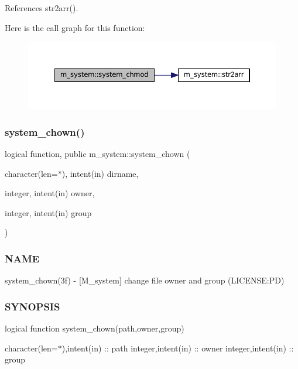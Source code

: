 References str2arr().

Here is the call graph for this function\+:
\nopagebreak
\begin{figure}[H]
\begin{center}
\leavevmode
\includegraphics[width=350pt]{namespacem__system_ace9ce0c8a9c8341a76b8903cd2390ce3_cgraph}
\end{center}
\end{figure}
\mbox{\label{namespacem__system_a3353c1cff032fcfe2985a69f10038ddd}} 
\subsubsection{\texorpdfstring{system\+\_\+chown()}{system\_chown()}}
{\footnotesize\ttfamily logical function, public m\+\_\+system\+::system\+\_\+chown (\begin{DoxyParamCaption}\item[{character(len=$\ast$), intent(in)}]{dirname,  }\item[{integer, intent(in)}]{owner,  }\item[{integer, intent(in)}]{group }\end{DoxyParamCaption})}



\subsubsection*{N\+A\+ME}

system\+\_\+chown(3f) -\/ \mbox{[}M\+\_\+system\mbox{]} change file owner and group (L\+I\+C\+E\+N\+SE\+:PD) 

\subsubsection*{S\+Y\+N\+O\+P\+S\+IS}

logical function system\+\_\+chown(path,owner,group)

character(len=$\ast$),intent(in) \+:\+: path integer,intent(in) \+:\+: owner integer,intent(in) \+:\+: group

